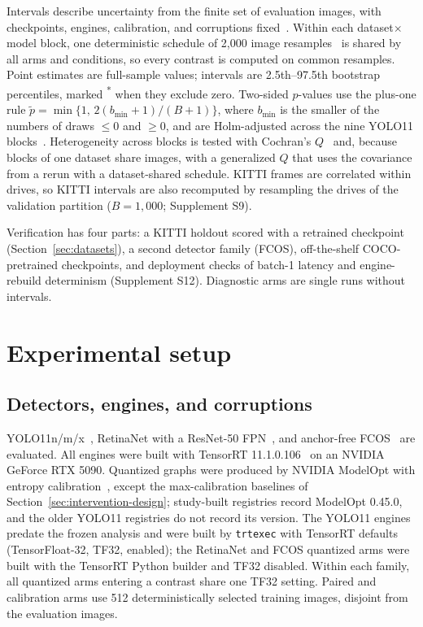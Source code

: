 \documentclass[a4paper,fleqn]{cas-dc}
\newcommand{\sigstar}{\textsuperscript{*}}
\begin{document}
Intervals describe uncertainty from the finite set of evaluation images, with checkpoints, engines, calibration, and corruptions fixed~\citep{bouthillier2021variance,pineau2021reproducibility}. Within each dataset$\times$model block, one deterministic schedule of 2,000 image resamples~\citep{efron1979bootstrap} is shared by all arms and conditions, so every contrast is computed on common resamples. Point estimates are full-sample values; intervals are 2.5th--97.5th bootstrap percentiles, marked \sigstar{} when they exclude zero. Two-sided $p$-values use the plus-one rule $\widetilde p=\min\{1,\,2(b_{\min}{+}1)/(B{+}1)\}$, where $b_{\min}$ is the smaller of the numbers of draws $\le0$ and $\ge0$, and are Holm-adjusted across the nine YOLO11 blocks~\citep{holm1979simple}. Heterogeneity across blocks is tested with Cochran's $Q$~\citep{cochran1954combination,higgins2002quantifying} and, because blocks of one dataset share images, with a generalized $Q$ that uses the covariance from a rerun with a dataset-shared schedule. KITTI frames are correlated within drives, so KITTI intervals are also recomputed by resampling the \nnClDrives{} drives of the validation partition ($B=1{,}000$; Supplement S9).

Verification has four parts: a KITTI holdout scored with a retrained checkpoint (Section~\ref{sec:datasets}), a second detector family (FCOS), off-the-shelf COCO-pretrained checkpoints, and deployment checks of batch-1 latency and engine-rebuild determinism (Supplement S12). Diagnostic arms are single runs without intervals.

\section{Experimental setup}
\label{sec:setup}

\subsection{Detectors, engines, and corruptions}
\label{sec:corruptions}

YOLO11n/m/x~\citep{jocher2024yolo11}, RetinaNet with a ResNet-50 FPN~\citep{lin2017focal,torchvision2026retinanet}, and anchor-free FCOS~\citep{tian2019fcos,torchvision2026fcos} are evaluated. All engines were built with TensorRT 11.1.0.106~\citep{nvidia2026tensorrt} on an NVIDIA GeForce RTX 5090. Quantized graphs were produced by NVIDIA ModelOpt with entropy calibration~\citep{nvidia2026modelopt,migacz2017entropy}, except the max-calibration baselines of Section~\ref{sec:intervention-design}; study-built registries record ModelOpt 0.45.0, and the older YOLO11 registries do not record its version. The YOLO11 engines predate the frozen analysis and were built by \texttt{trtexec} with TensorRT defaults (TensorFloat-32, TF32, enabled); the RetinaNet and FCOS quantized arms were built with the TensorRT Python builder and TF32 disabled. Within each family, all quantized arms entering a contrast share one TF32 setting. Paired and calibration arms use 512 deterministically selected training images, disjoint from the evaluation images.
\end{document}
